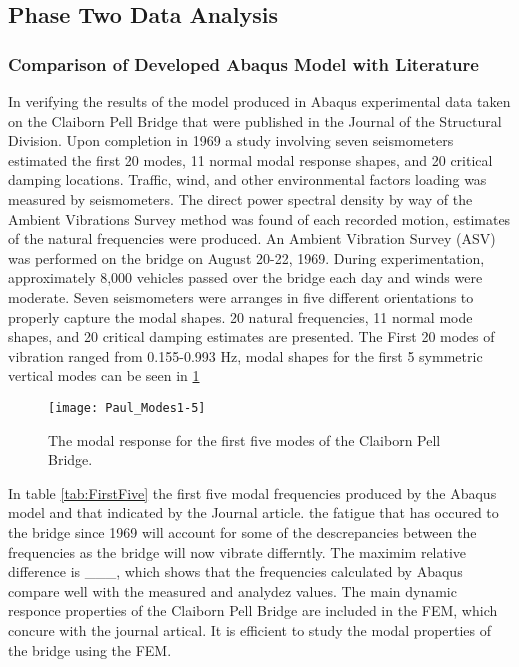 \subsection{Phase Two Data Analysis}

\subsubsection{Comparison of Developed Abaqus Model with Literature}


In verifying the results of the model produced in Abaqus experimental data taken on the Claiborn Pell Bridge that were published in the Journal of the
Structural Division. Upon completion in 1969 a study involving seven seismometers estimated the first 20 modes, 11 normal modal response shapes, and 20
critical damping locations. Traffic, wind, and other environmental factors loading was measured by seismometers. The direct power spectral density by
way of the Ambient Vibrations Survey method was found of each recorded motion, estimates of the natural frequencies were produced. An Ambient Vibration
Survey (ASV) was performed on the bridge on August 20-22, 1969. During experimentation, approximately 8,000 vehicles passed over the bridge each day
and winds were moderate. Seven seismometers were arranges in five different orientations to properly capture the modal shapes. 20 natural
frequencies, 11 normal mode shapes, and 20 critical damping estimates are presented. The First 20 modes of vibration ranged from 0.155-0.993 Hz,
modal shapes for the first 5 symmetric vertical modes can be seen in \ref{fig:Paul_Modes1-5}\\

\begin{figure}

\centering

\texttt{[image: Paul\_Modes1-5]}

\caption{The modal response for the first five modes of the Claiborn Pell Bridge.}

\label{fig:Paul_Modes1-5}

\end{figure}

In table \ref{tab:FirstFive} the first five modal frequencies produced by the Abaqus model and that indicated by the Journal
article. 
the fatigue that has occured to the bridge since 1969 will account for some of the descrepancies between the frequencies as the bridge will now vibrate differntly. 
The maximim relative difference is ___, which shows that the frequencies calculated by Abaqus compare well with the measured and analydez values. 
The main dynamic responce properties of the Claiborn Pell Bridge are included in the FEM, which concure with the journal artical. 
It is efficient to study the modal properties of the bridge using the FEM.


